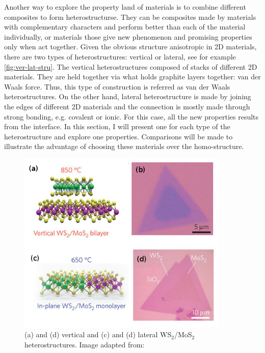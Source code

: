 Another way to explore the property land of materials is to combine different composites to form heterostructurse\cite{Geim_Grigorieva_2013,Liu2016b,Pomerantseva2017}. They can be composites made by materials with complementary characters and perform better than each of the material individually, or materials those give new phenomenon and promising properties only when act together.  Given the obvious structure anisotropic in 2D materials, there are two types of heterostructures: vertical or lateral, see for example \autoref{fig:ver-lat-stru}. The vertical heterostructures composed of stacks of different 2D materials. They are held together via what holds graphite layers together: van der Waals force. Thus, this type of construction is referred as van der Waals heterostructures.  On the other hand, lateral heterostructure\cite{Jena2014,Chhowalla2015} is made by joining the edges of different 2D materials and the connection is mostly made through strong bonding, e.g. covalent or ionic. For this case, all the new properties results from the interface. In this section, I will present one for each type of the heterostructure and explore one properties. Comparisons will be made to illustrate the advantage of choosing these materials over the homo-structure. 

\begin{figure}[htb]
\centering
\includegraphics[width=0.9\textwidth]{ver-lat-stru.png}
\caption{ (a) and (d) vertical and (c) and (d) lateral WS$_2$/MoS$_2$ heterostructures. \label{fig:ver-lat-stru} Image adapted from: \cite{Gong_Lin2014}}
\end{figure}

